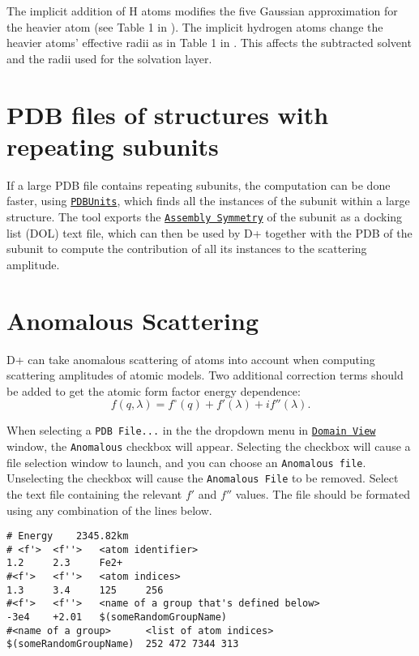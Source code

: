 \documentclass[../D+Manual.tex]{subfiles}
\begin{document}
The implicit addition of H atoms modifies the five Gaussian approximation for the heavier atom (see Table 1 in \cite{Dplus2017}).
The implicit hydrogen atoms change the heavier atoms' effective radii as in Table 1 in \textcite{svergun1995crysol}.
This affects the subtracted solvent and the radii used for the solvation layer.
\section{PDB files of structures with repeating subunits}
If a large PDB file contains repeating subunits, the computation can be done faster, using \hyperref[PDBUnit]{\texttt{PDBUnits}}, which finds all the instances
of the subunit within a large structure. The tool
exports the \hyperref[chp:Symmetries]{\texttt{Assembly Symmetry}} of the subunit as a docking list (DOL) text file, which can then be used by D+ together with the PDB of the subunit to compute the contribution of all its instances to the scattering amplitude. 

\section{Anomalous Scattering} \label{sec:anomalousScattering}
D+ can take anomalous scattering of atoms into account when computing scattering amplitudes of atomic models. Two additional correction terms should be added to get the atomic form factor energy dependence:
\begin{equation*}
	f(q,\lambda) = f^\circ(q) + f'(\lambda) + i f''(\lambda).
\end{equation*}

When selecting a \texttt{PDB File...} in the the dropdown menu in  \hyperref[sec:domainView]{\texttt{Domain View}} window, the \texttt{Anomalous} checkbox will appear. Selecting the checkbox will cause a file selection window to launch, and you can choose an \texttt{Anomalous file}. Unselecting the checkbox will cause the \texttt{Anomalous File} to be removed.
Select the text file containing the relevant $f'$ and $f''$ values.
The file should be formated using any combination of the lines below.

\lstset{style=anomalousFile,}

\begin{lstlisting}
# Energy    2345.82km
# <f'>  <f''>   <atom identifier>
1.2     2.3     Fe2+
#<f'>   <f''>   <atom indices>
1.3     3.4     125     256
#<f'>   <f''>   <name of a group that's defined below>
-3e4    +2.01   $(someRandomGroupName)
#<name of a group>      <list of atom indices>
$(someRandomGroupName)  252 472 7344 313
\end{lstlisting}
\end{document}
